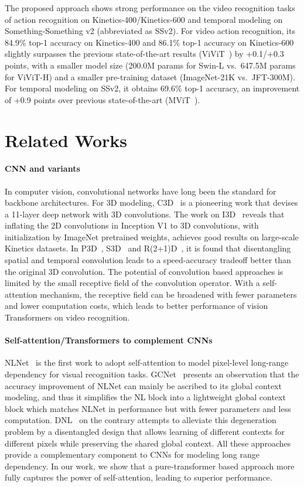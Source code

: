 \documentclass{article}
\begin{document}
The proposed approach shows strong performance on the video recognition tasks of action recognition on Kinetics-400/Kinetics-600 and temporal modeling on Something-Something v2 (abbreviated as SSv2).
For video action recognition, its 84.9\% top-1 accuracy on Kinetics-400 and 86.1\% top-1 accuracy on Kinetics-600 slightly surpasses the previous state-of-the-art results (ViViT~\cite{arnab2021vivit}) by +0.1/+0.3 points, with a smaller model size (200.0M params for Swin-L vs.~647.5M params for ViViT-H) and a smaller pre-training dataset (ImageNet-21K vs.~JFT-300M).
For temporal modeling on SSv2, it obtains 69.6\% top-1 accuracy, an improvement of +0.9 points over previous state-of-the-art (MViT~\cite{mvit2021}).

\section{Related Works}

\paragraph{CNN and variants} 
In computer vision, convolutional networks have long been the standard for backbone architectures.
For 3D modeling, C3D~\cite{tran2015learning} is a pioneering work that devises a 11-layer deep network with 3D convolutions. 
The work on I3D~\cite{carreira2017i3d} reveals that inflating the 2D convolutions in Inception V1 to 3D convolutions, with initialization by ImageNet pretrained weights, achieves good results on large-scale Kinetics datasets.
In P3D~\cite{qiu2017P3D}, S3D~\cite{xie2018rethinking} and R(2+1)D~\cite{tran2018closer}, it is found that disentangling spatial and temporal convolution leads to a speed-accuracy tradeoff better than the original 3D convolution.
The potential of convolution based approaches is limited by the small receptive field of the convolution operator. With a self-attention mechanism, the receptive field can be broadened with fewer parameters and lower computation costs, which leads to better performance of vision Transformers on video recognition.


\paragraph{Self-attention/Transformers to complement CNNs}
NLNet~\cite{wang2018non} is the first work to adopt self-attention to model pixel-level long-range dependency for visual recognition tasks. 
GCNet~\cite{cao2019gcnet} presents an observation that the accuracy improvement of NLNet can mainly be ascribed to its global context modeling, and thus it simplifies the NL block into a lightweight global context block which matches NLNet in performance but with fewer parameters and less computation.
DNL~\cite{yin2020DNL} on the contrary attempts to alleviate this degeneration problem by a disentangled design that allows learning of different contexts for different pixels while preserving the shared global context.
All these approaches provide a complementary component to CNNs for modeling long range dependency. In our work, we show that a pure-transformer based approach more fully captures the power of self-attention, leading to superior performance.
\end{document}
